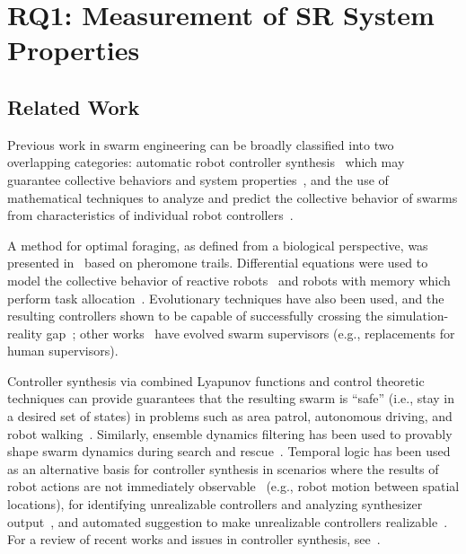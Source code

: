 \chapter{RQ1: Measurement of SR System Properties}%
\label{chap:measurement}

\section{Related Work}\label{measurement:sec:rw}
%
Previous work in swarm engineering can be broadly classified into two
overlapping categories: automatic robot controller
synthesis~\cite{Francesca2014} which may guarantee collective behaviors and
system
properties~\cite{Winfield2005,Campo2007,Turgut2008,Correll2008,Moarref2018},
and the use of mathematical techniques to analyze and predict the collective
behavior of swarms from characteristics of individual robot
controllers~\cite{Talamali2020,Lerman2006,Berman2007}.

A method for optimal foraging, as defined from a biological perspective, was
presented in~\cite{Talamali2020} based on pheromone trails. Differential
equations were used to model the collective behavior of reactive
robots~\cite{Lerman2001} and robots with memory which perform task
allocation~\cite{Lerman2006}. Evolutionary techniques have also been used, and
the resulting controllers shown to be capable of successfully crossing the
simulation-reality gap~\cite{Francesca2014,Ligot2020}; other
works~\cite{Hogg2020} have evolved swarm supervisors (e.g., replacements for
human supervisors).

Controller synthesis via combined Lyapunov functions and control theoretic
techniques can provide guarantees that the resulting swarm is ``safe'' (i.e.,
stay in a desired set of states) in problems such as area patrol, autonomous
driving, and robot
walking~\cite{Panagou2020,Glotfelter2019,Ames2021}. Similarly, ensemble dynamics
filtering has been used to provably shape swarm dynamics during search and
rescue~\cite{Hsieh2013}. Temporal logic has been used as an alternative basis
for controller synthesis in scenarios where the results of robot actions are not
immediately observable~\cite{Winfield2005,Moarref2018} (e.g., robot motion
between spatial locations), for identifying unrealizable controllers and
analyzing synthesizer output~\cite{Baumeister2020}, and automated suggestion to
make unrealizable controllers realizable~\cite{Pacheck2020}. For a review of
recent works and issues in controller synthesis, see~\cite{Birattari2019}.

